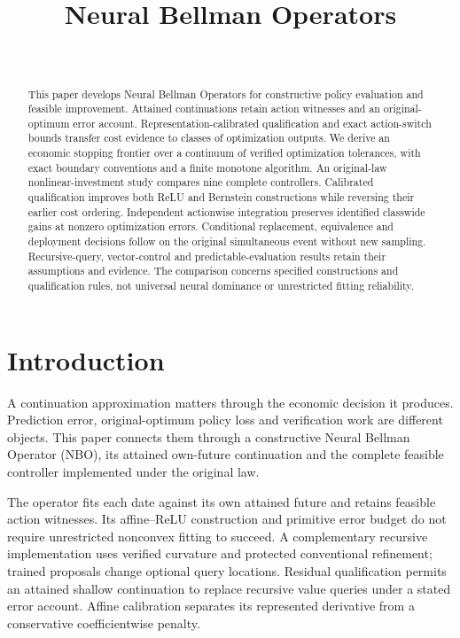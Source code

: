 \documentclass[ecta,nameyear,draft]{econsocart}
\begin{document}
\begin{frontmatter}
\title{Neural Bellman Operators}
\begin{aug}
\author[id=au1,addressref={add1}]{~}
\address[id=add1]{Peking University}
\end{aug}
\begin{abstract}
This paper develops Neural Bellman Operators for constructive policy evaluation and feasible improvement. Attained continuations retain action witnesses and an original-optimum error account. Representation-calibrated qualification and exact action-switch bounds transfer cost evidence to classes of optimization outputs. We derive an economic stopping frontier over a continuum of verified optimization tolerances, with exact boundary conventions and a finite monotone algorithm. An original-law nonlinear-investment study compares nine complete controllers. Calibrated qualification improves both ReLU and Bernstein constructions while reversing their earlier cost ordering. Independent actionwise integration preserves identified classwide gains at nonzero optimization errors. Conditional replacement, equivalence and deployment decisions follow on the original simultaneous event without new sampling. Recursive-query, vector-control and predictable-evaluation results retain their assumptions and evidence. The comparison concerns specified constructions and qualification rules, not universal neural dominance or unrestricted fitting reliability.
\end{abstract}
\begin{keyword}
\end{keyword}
\end{frontmatter}
\section{Introduction}\label{sec:introduction65}
A continuation approximation matters through the economic decision it produces. Prediction error, original-optimum policy loss and verification work are different objects. This paper connects them through a constructive Neural Bellman Operator (NBO), its attained own-future continuation and the complete feasible controller implemented under the original law.

The operator fits each date against its own attained future and retains feasible action witnesses. Its affine--ReLU construction and primitive error budget do not require unrestricted nonconvex fitting to succeed. A complementary recursive implementation uses verified curvature and protected conventional refinement; trained proposals change optional query locations. Residual qualification permits an attained shallow continuation to replace recursive value queries under a stated error account. Affine calibration separates its represented derivative from a conservative coefficientwise penalty.
\end{document}
